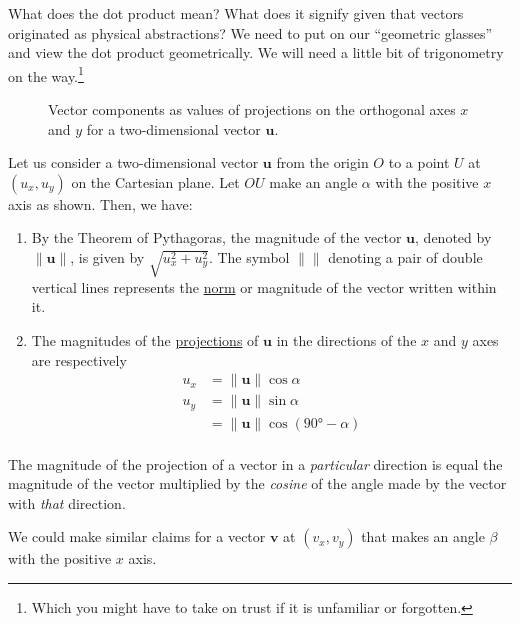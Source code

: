 \documentclass[
  a4paper,
]{article}
\begin{document}
What does the dot product mean? What does it signify given that vectors
originated as physical abstractions? We need to put on our ``geometric
glasses'' and view the dot product geometrically. We will need a little
bit of trigonometry on the way.\footnote{Which you might have to take on
  trust if it is unfamiliar or forgotten.}

\begin{figure}
\hypertarget{fig:projection}{%
\centering

\caption{Vector components as values of projections on the orthogonal
axes \(x\) and \(y\) for a two-dimensional vector
\(\mathbf{u}\).}\label{fig:projection}
}
\end{figure}

Let us consider a two-dimensional vector \(\mathbf{u}\) from the origin
\(O\) to a point \(U\) at \((u_{x}, u_{y})\) on the Cartesian plane. Let
\(OU\) make an angle \(\alpha\) with the positive \(x\) axis as shown.
Then, we have:

\begin{enumerate}
\def\labelenumi{\arabic{enumi}.}
\item
  By the Theorem of Pythagoras, the magnitude of the vector
  \(\mathbf{u}\), denoted by \(\lVert\mathbf{u}\rVert\), is given by
  \(\sqrt{u_{x}^2 + u_{y}^2}\). The symbol \(\lVert\text{}\rVert\)
  denoting a pair of double vertical lines represents the
  \href{https://mathworld.wolfram.com/Norm.html}{norm} or magnitude of
  the vector written within it.
\item
  The magnitudes of the
  \href{https://en.wikipedia.org/wiki/Vector_projection}{projections} of
  \(\mathbf{u}\) in the directions of the \(x\) and \(y\) axes are
  respectively \[
  \begin{aligned}
  u_{x} &= \lVert\mathbf{u}\rVert\cos\alpha\\
  u_{y} &= \lVert\mathbf{u}\rVert\sin\alpha\\
  &= \lVert\mathbf{u}\rVert\cos(90°-\alpha)\\
  \end{aligned}
  \]
\end{enumerate}

The magnitude of the projection of a vector in a \emph{particular}
direction is equal the magnitude of the vector multiplied by the
\emph{cosine} of the angle made by the vector with \emph{that}
direction.

We could make similar claims for a vector \(\mathbf{v}\) at
\((v_{x}, v_{y})\) that makes an angle \(\beta\) with the positive \(x\)
axis.
\end{document}
